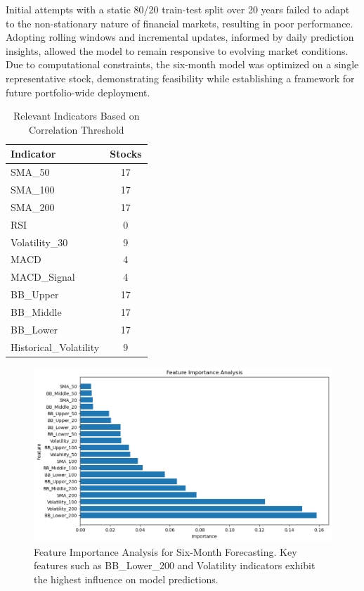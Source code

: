 \documentclass[10pt,twocolumn]{article}
\begin{document}
Initial attempts with a static 80/20 train-test split over 20 years failed to adapt to the non-stationary nature of financial markets, resulting in poor performance. Adopting rolling windows and incremental updates, informed by daily prediction insights, allowed the model to remain responsive to evolving market conditions. Due to computational constraints, the six-month model was optimized on a single representative stock, demonstrating feasibility while establishing a framework for future portfolio-wide deployment.

\begin{table}[htbp]
    \centering
    \caption{Relevant Indicators Based on Correlation Threshold}
    \label{tab:relevant_indicators}
    \begin{tabular}{|p{0.4\linewidth}|c|}
        \hline
        \textbf{Indicator} & \textbf{Stocks} \\
        \hline
        SMA\_50             & 17 \\
        SMA\_100            & 17 \\
        SMA\_200            & 17 \\
        RSI                 & 0  \\
        Volatility\_30      & 9  \\
        MACD                & 4  \\
        MACD\_Signal        & 4  \\
        BB\_Upper           & 17 \\
        BB\_Middle          & 17 \\
        BB\_Lower           & 17 \\
        Historical\_Volatility & 9 \\
        \hline
    \end{tabular}
\end{table}

\begin{figure}[htbp]
    \centering
    \includegraphics[width=\linewidth]{feature_importance_chart.png}
    \caption{Feature Importance Analysis for Six-Month Forecasting. Key features such as BB\_Lower\_200 and Volatility indicators exhibit the highest influence on model predictions.}
    \label{fig:feature_importance}
\end{figure}
\end{document}
